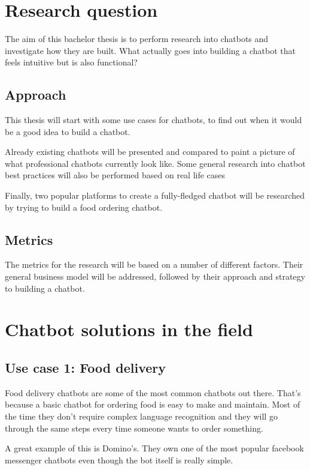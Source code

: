 \chapter{Research question}

The aim of this bachelor thesis is to perform research into chatbots and investigate how they are built. What actually goes into building a chatbot that feels intuitive but is also functional?

\section{Approach}

This thesis will start with some use cases for chatbots, to find out when it would be a good idea to build a chatbot.

Already existing chatbots will be presented and compared to paint a picture of what professional chatbots currently look like.
Some general research into chatbot best practices will also be performed based on real life cases

Finally, two popular platforms to create a fully-fledged chatbot will be researched by trying to build a food ordering chatbot.

\section{Metrics}

The metrics for the research will be based on a number of different factors. Their general business model will be addressed, followed by their approach and strategy to building a chatbot.

\chapter{Chatbot solutions in the field}

\section{Use case 1: Food delivery}

Food delivery chatbots are some of the most common chatbots out there. That's because a basic chatbot for ordering food is easy to make and maintain. Most of the time they don't require complex language recognition and they will go through the same steps every time someone wants to order something.

A great example of this is Domino's\cite{dominos}. They own one of the most popular facebook messenger chatbots even though the bot itself is really simple.

